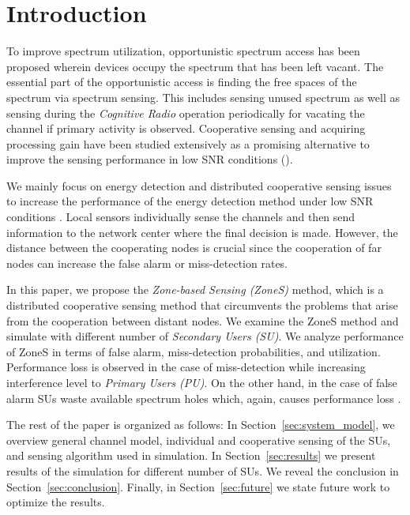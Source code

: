 \documentclass[conference,compsoc]{IEEEtran}
\begin{document}
\IEEEpeerreviewmaketitle



\section{Introduction}

To improve spectrum utilization, opportunistic spectrum access has been proposed wherein devices occupy the spectrum that has been left vacant. The essential part of the opportunistic access is finding the free spaces of the spectrum via spectrum sensing. This includes sensing unused spectrum as well as sensing during the \emph{Cognitive Radio} operation periodically for vacating the channel if primary activity is observed. Cooperative sensing and acquiring processing gain have been studied extensively as a promising alternative to improve the sensing performance in low SNR conditions (\cite{ganesan2005css, kattepur2007data, quan2008spatial, quan2009optimal, unnikrishnan2008csp, aysal2008cooperative}).

We mainly focus on energy detection and distributed cooperative sensing issues to increase the performance of the energy detection method under low SNR conditions \cite{sensingReview2011}. Local sensors individually sense the channels and then send information to the network center where the final decision is made\cite{crSensingCDMA2010}. However, the distance between the cooperating nodes is crucial since the cooperation of far nodes can increase the false alarm or miss-detection rates.

In this paper, we propose the \textit{Zone-based Sensing (ZoneS)} method, which is a distributed cooperative sensing method that circumvents the problems that arise from the cooperation between distant nodes. We examine the ZoneS method and simulate with different number of \textit{Secondary Users (SU)}. We analyze performance of ZoneS in terms of false alarm, miss-detection probabilities, and utilization. Performance loss is observed in the case of miss-detection while increasing interference level to \textit{Primary Users (PU)}. On the other hand, in the case of false alarm SUs waste available spectrum holes which, again, causes performance loss \cite{parameterOptimization}.

The rest of the paper is organized as follows: In Section~\ref{sec:system_model}, we overview general channel model, individual and cooperative sensing of the SUs, and sensing algorithm used in simulation. In Section~\ref{sec:results} we present results of the simulation for different number of SUs. We reveal the conclusion in Section~\ref{sec:conclusion}. Finally, in Section~\ref{sec:future} we state future work to optimize the results.
\end{document}
